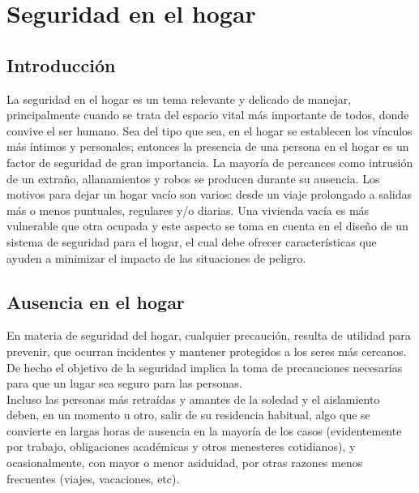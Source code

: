 \chapter{Seguridad en el hogar}



\section{Introducción}
La seguridad en el hogar es un tema relevante y delicado de manejar, principalmente cuando se trata del espacio vital más importante de todos, donde convive el ser humano. Sea del tipo que sea, en el hogar se establecen los vínculos más íntimos y personales; entonces la presencia de una persona en el hogar es un factor de seguridad de gran importancia. La mayoría de percances como intrusión de un extraño, allanamientos y robos se producen durante su ausencia. Los motivos para dejar un hogar vacío son varios: desde un viaje prolongado a salidas más o menos puntuales, regulares y/o diarias. Una vivienda vacía es más vulnerable que otra ocupada y este aspecto se toma en cuenta en el diseño de un sistema de seguridad para el hogar, el cual debe ofrecer características que ayuden a minimizar el impacto de las situaciones de peligro.\\

\section{Ausencia en el hogar}
En materia de seguridad del hogar, cualquier precaución, resulta de utilidad para prevenir, que ocurran incidentes y mantener protegidos a los seres más cercanos. De hecho el objetivo de la seguridad implica la toma de precauciones necesarias para que un lugar sea seguro para las personas.\\

Incluso las personas más retraídas y amantes de la soledad y el aislamiento deben, en un momento u otro, salir de su residencia habitual, algo que se convierte en largas horas de ausencia en la mayoría de los casos (evidentemente por trabajo, obligaciones académicas y otros menesteres cotidianos), y ocasionalmente, con mayor o menor asiduidad, por otras razones menos frecuentes (viajes, vacaciones, etc).\\
 
